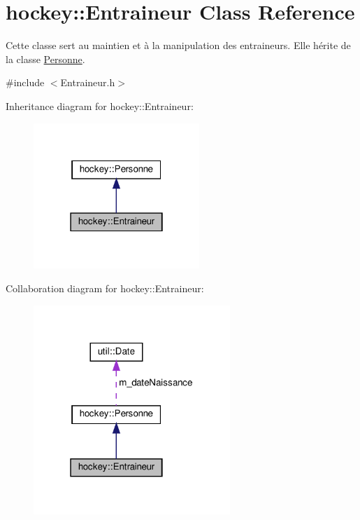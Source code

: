 \hypertarget{classhockey_1_1Entraineur}{}\section{hockey\+:\+:Entraineur Class Reference}
\label{classhockey_1_1Entraineur}


Cette classe sert au maintien et à la manipulation des entraineurs. Elle hérite de la classe \hyperlink{classhockey_1_1Personne}{Personne}.  




{\ttfamily \#include $<$Entraineur.\+h$>$}



Inheritance diagram for hockey\+:\+:Entraineur\+:\nopagebreak
\begin{figure}[H]
\begin{center}
\leavevmode
\includegraphics[width=178pt]{classhockey_1_1Entraineur__inherit__graph}
\end{center}
\end{figure}


Collaboration diagram for hockey\+:\+:Entraineur\+:\nopagebreak
\begin{figure}[H]
\begin{center}
\leavevmode
\includegraphics[width=211pt]{classhockey_1_1Entraineur__coll__graph}
\end{center}
\end{figure}
